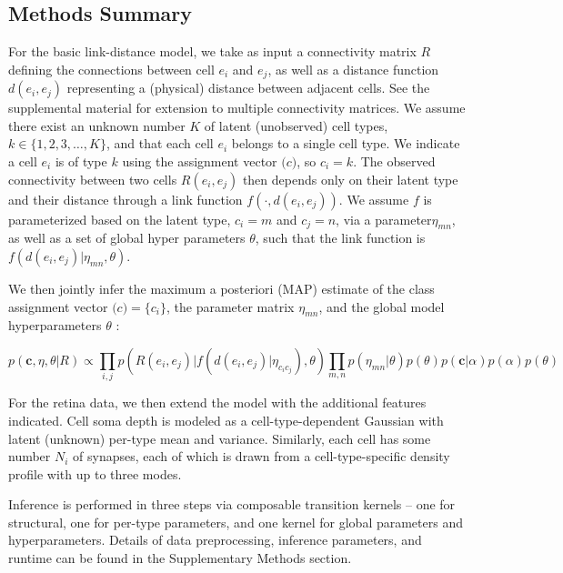 \documentclass{article}
\renewcommand{\vec}[1]{\mathbf{#1}}
\begin{document}
\subsection*{Methods Summary}

For the basic link-distance model, we take as input a connectivity
matrix $R$ defining the connections between cell $e_i$ and $e_j$, as
well as a distance function $d(e_i, e_j)$ representing a (physical)
distance between adjacent cells.  See
the supplemental material for extension to multiple connectivity
matrices. We assume there exist an unknown number $K$ of latent
(unobserved) cell types, $k \in \{1, 2, 3, \dots, K\}$, and that each
cell $e_i$ belongs to a single cell type. We indicate a cell $e_i$ is
of type $k$ using the assignment vector $\vec(c)$, so $c_i = k$. The
observed connectivity between two cells $R(e_i, e_j)$ then depends
only on their latent type and their distance through a link function
$f(\cdot, d(e_i, e_j))$. We assume $f$ is parameterized based on the
latent type, $c_i=m$ and $c_j=n$, via a parameter$\eta_{mn}$, as well
as a set of global hyper parameters $\theta$, such that the link
function is $f(d(e_i, e_j) | \eta_{mn}, \theta)$.

We then jointly infer the maximum a posteriori (MAP) estimate of the
class assignment vector $\vec(c) = \{c_i\}$, the parameter matrix
$\eta_{mn}$, and the global model hyperparameters $\theta$ :

\begin{equation}
  p(\vec{c}, \eta, \theta | R ) \propto \prod_{i, j} p(R(e_i, e_j) | f(d(e_i, e_j) | \eta_{c_ic_j}), \theta) \prod_{m, n} p(\eta_{mn} | \theta)  p(\theta) p(\vec{c} | \alpha) p(\alpha) p(\theta)
\end{equation}

For the retina data, we then extend the model with the additional
features indicated. Cell soma depth is modeled as a
cell-type-dependent Gaussian with latent (unknown) per-type mean and
variance. Similarly, each cell has some number $N_i$ of synapses, 
each of which is drawn from a cell-type-specific density profile
with up to three modes.


Inference is performed in three steps via composable transition 
kernels -- one for structural, one for per-type parameters, and
one kernel for global parameters and hyperparameters. Details
of data preprocessing, inference parameters, and runtime can
be found in the Supplementary Methods section. 

\printbibliography
\end{document}
